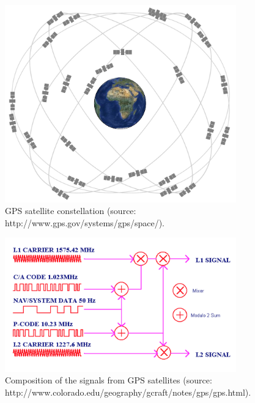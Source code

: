 \clearpage
\begin{figure}
	\centering
	\includegraphics[width=100mm]{figs_chpt2/Fig3.jpg}	
	\caption[GPS satellite constellation.]{GPS satellite constellation (source: http://www.gps.gov/systems/gps/space/).}
	\label{fig:chpt2_fig3}
\end{figure}

\clearpage
\begin{figure}
	\centering
	\includegraphics[width=100mm]{figs_chpt2/Fig4}	
	\caption[Composition of the signals from GPS satellites.]{Composition of the signals from GPS satellites (source: http://www.colorado.edu/geography/gcraft/notes/gps/gps.html).}
	\label{fig:chpt2_fig4}
\end{figure}

